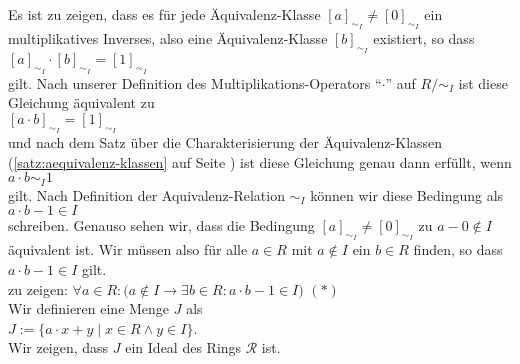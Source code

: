 \proof  
Es ist zu zeigen, dass es für jede Äquivalenz-Klasse $[a]_{\sim_I} \not= [0]_{\sim_I}$ ein
multiplikatives Inverses, also eine Äquivalenz-Klasse $[b]_{\sim_I}$ existiert, so dass
\\[0.2cm]
\hspace*{1.3cm}
$[a]_{\sim_I} \cdot [b]_{\sim_I} = [1]_{\sim_I}$
\\[0.2cm]
gilt.  Nach unserer Definition des Multiplikations-Operators ``$\cdot$'' auf $R/\!\!\sim_I$ ist diese Gleichung
äquivalent zu
\\[0.2cm]
\hspace*{1.3cm}
$[a \cdot b]_{\sim_I} = [1]_{\sim_I}$
\\[0.2cm] 
und nach dem Satz über die Charakterisierung der Äquivalenz-Klassen (\ref{satz:aequivalenz-klassen} auf
Seite \pageref{satz:aequivalenz-klassen})  ist diese Gleichung genau dann erfüllt, wenn
\\[0.2cm]
\hspace*{1.3cm}
$a \cdot b \sim_I 1$
\\[0.2cm]
gilt.  Nach Definition der Aquivalenz-Relation $\sim_I$ können wir diese Bedingung als
\\[0.2cm]
\hspace*{1.3cm}
$a \cdot b - 1 \in I$
\\[0.2cm]
schreiben.  Genauso sehen wir, dass die Bedingung $[a]_{\sim_I} \not= [0]_{\sim_I}$ zu $a - 0 \not\in I$ äquivalent ist.
Wir müssen also für alle $a \in R$ mit $a \not\in I$ ein $b \in R$ finden, so dass $a \cdot b - 1 \in I$
gilt.
\\[0.2cm]
\hspace*{1.3cm}
zu zeigen: \quad 
$\forall a \in R:\bigl(a \not \in I \rightarrow \exists b \in R: a \cdot b - 1 \in I\bigr)$
\hspace*{\fill} $(*)$
\\[0.2cm]
Wir definieren eine Menge $J$ als
\\[0.2cm]
\hspace*{1.3cm}
$J := \bigl\{ a \cdot x + y \mid x \in R \wedge y \in I \bigr\}$.
\\[0.2cm]
Wir zeigen, dass $J$ ein Ideal des Rings $\mathcal{R}$ ist.
